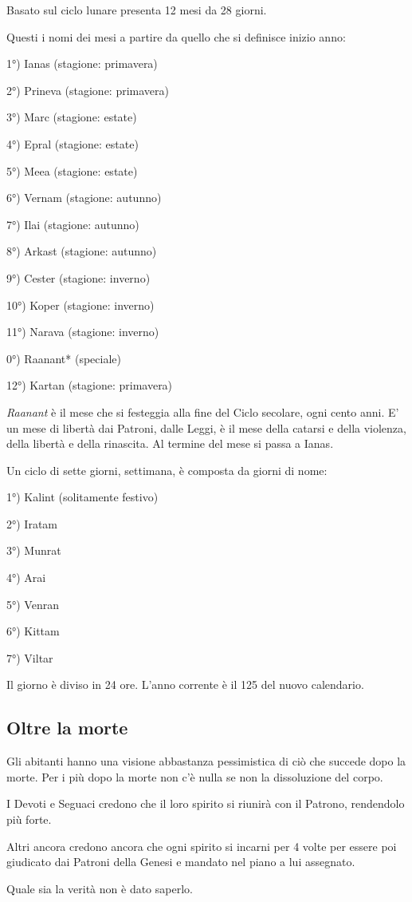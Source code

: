 \begin{multicols}{2}

\label{il-calendario}

Basato sul ciclo lunare presenta 12 mesi da 28 giorni.

Questi i nomi dei mesi a partire da quello che si definisce inizio anno:

1°) Ianas (stagione: primavera)

2°) Prineva (stagione: primavera)

3°) Marc (stagione: estate)

4°) Epral (stagione: estate)

5°) Meea (stagione: estate)

6°) Vernam (stagione: autunno)

7°) Ilai (stagione: autunno)

8°) Arkast (stagione: autunno)

9°) Cester (stagione: inverno)

10°) Koper (stagione: inverno)

11°) Narava (stagione: inverno)

0°) Raanant* (speciale)

12°) Kartan (stagione: primavera)

\medskip

\emph{Raanant} è il mese che si festeggia alla fine del Ciclo secolare, ogni cento anni. E' un mese di libertà dai Patroni, dalle Leggi, è il mese della catarsi e della violenza, della libertà e della rinascita. Al termine del mese si passa a Ianas.

\medskip

Un ciclo di sette giorni, settimana, è composta da giorni di nome:

\medskip

1°) Kalint (solitamente festivo)

2°) Iratam

3°) Munrat

4°) Arai

5°) Venran

6°) Kittam

7°) Viltar

\medskip

Il giorno è diviso in 24 ore. L'anno corrente è il 125 del nuovo calendario.

\subsection{Oltre la morte}

Gli abitanti hanno una visione abbastanza pessimistica di ciò che succede dopo la morte. Per i più dopo la morte non c'è nulla se non la dissoluzione del corpo.

I Devoti e Seguaci credono che il loro spirito si riunirà con il Patrono, rendendolo più forte.

Altri ancora credono ancora che ogni spirito si incarni per 4 volte per essere poi giudicato dai Patroni della Genesi e mandato nel piano a lui assegnato.

Quale sia la verità non è dato saperlo.

\end{multicols}

